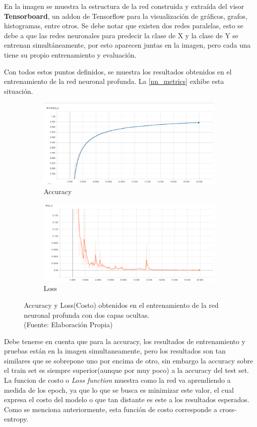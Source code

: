 En la imagen se muestra la estructura de la red construida y extraída del visor \textbf{Tensorboard}, un addon de Tensorflow para la visualización de gráficos, grafos, histogramas, entre otros. Se debe notar que existen dos redes paralelas, esto se debe a que las redes neuronales para predecir la clase de X y la clase de Y se entrenan simultáneamente, por esto aparecen juntas en la imagen, pero cada una tiene su propio entrenamiento y evaluación.

Con todos estos puntos definidos, se muestra los resultados obtenidos en el entrenamiento de la red neuronal profunda. La \autoref{nn_metrics} exhibe esta situación.


\begin{figure}[ht!]
\centering
\begin{subfigure}{.5\textwidth}
  \centering
  \includegraphics[width=.8\linewidth]{figures/nn_plot.png}
  \caption{Accuracy}
  \label{fig:sub1}
\end{subfigure}%
\begin{subfigure}{.5\textwidth}
  \centering
  \includegraphics[width=.8\linewidth]{figures/nn_loss.png}
  \caption{Loss}
  \label{fig:sub2}
\end{subfigure}
\caption[abs]{Accuracy y Loss(Costo) obtenidos en el entrenamiento de la red neuronal profunda con dos capas ocultas. \\
{\scriptsize (Fuente: Elaboración Propia)}}
\label{fig:nn_metrics}
\end{figure}

Debe tenerse en cuenta que para la accuracy, los resultados de entrenamiento y pruebas están en la imagen simultaneamente, pero los resultados son tan similares que se sobrepone uno por encima de otro, sin embargo la accuracy sobre el train set es siempre superior(aunque por muy poco) a la accuracy del test set. La funcion de costo o \textit{Loss function} muestra como la red va aprendiendo a medida de los epoch, ya que lo que se busca es minimizar este valor, el cual expresa el costo del modelo o que tan distante es este a los resultados esperados. Como se menciona anteriormente, esta función de costo corresponde a cross-entropy.

